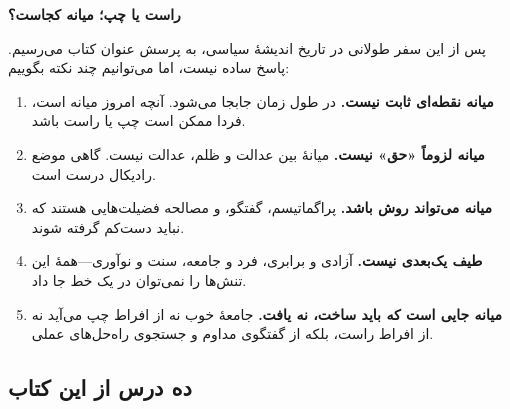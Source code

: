 \begin{tcolorbox}[
    enhanced,
    colback=centergreen!10,
    colframe=centergreen,
    boxrule=2pt,
    arc=10pt,
    fonttitle=\bfseries\large,
    title={\rl{📚 پاسخ به پرسش کتاب}}
]
\begin{center}
\Large\textbf{راست یا چپ؛ میانه کجاست؟}
\end{center}

\vspace{5mm}

پس از این سفر طولانی در تاریخ اندیشهٔ سیاسی، به پرسش عنوان کتاب می‌رسیم. پاسخ ساده نیست، اما می‌توانیم چند نکته بگوییم:

\begin{enumerate}
    \item \textbf{میانه نقطه‌ای ثابت نیست.} در طول زمان جابجا می‌شود. آنچه امروز میانه است، فردا ممکن است چپ یا راست باشد.
    
    \item \textbf{میانه لزوماً «حق» نیست.} میانهٔ بین عدالت و ظلم، عدالت نیست. گاهی موضع رادیکال درست است.
    
    \item \textbf{میانه می‌تواند روش باشد.} پراگماتیسم، گفتگو، و مصالحه فضیلت‌هایی هستند که نباید دست‌کم گرفته شوند.
    
    \item \textbf{طیف یک‌بعدی نیست.} آزادی و برابری، فرد و جامعه، سنت و نوآوری—همهٔ این تنش‌ها را نمی‌توان در یک خط جا داد.
    
    \item \textbf{میانه جایی است که باید ساخت، نه یافت.} جامعهٔ خوب نه از افراط چپ می‌آید نه از افراط راست، بلکه از گفتگوی مداوم و جستجوی راه‌حل‌های عملی.
\end{enumerate}
\end{tcolorbox}

\vspace{5mm}

\subsection{ده درس از این کتاب}

